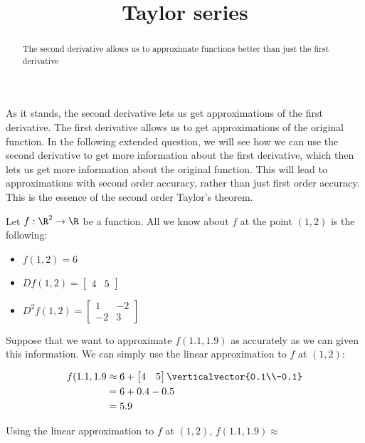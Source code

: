 \documentclass{ximera}
\title{Taylor series}
\begin{document}
	\begin{abstract}
		The second derivative allows us to approximate functions better than just the first derivative
	\end{abstract}
	
	As it stands, the second derivative lets us get approximations of the first derivative.  The first derivative allows us to get approximations of the original function.
	In the following extended question, we will see how we can use the second derivative to get more information about the first derivative, which then lets us get more
	information about the original function.  This will lead to approximations with second order accuracy, rather than just first order accuracy.  This is the essence of 
	the second order Taylor's theorem.
	
	\begin{question}
	Let $f:\R^2 \to \R$ be a function.  All we know about $f$ at the point $(1,2)$ is the following:
		\begin{itemize}
			\item $f(1,2) = 6$
			\item \(Df(1,2) = \begin{bmatrix} 4 & 5 \end{bmatrix}\)
			\item \( D^2f(1,2)  = \begin{bmatrix} 1 & -2 \\ -2 & 3\end{bmatrix}\)
		\end{itemize} 
		
		Suppose that we want to approximate $f(1.1,1.9)$ as accurately as we can given this information.
		We can simply use the linear approximation to $f$ at $(1,2)$:
		
		\begin{solution}
			\begin{hint}
				\begin{align*}
					f(1.1,1.9 &\approx 6+\begin{bmatrix} 4 & 5 \end{bmatrix} \verticalvector{0.1\\-0.1}\\
							&=6+0.4-0.5\\
							&=5.9
				\end{align*}
			\end{hint}
			Using the linear approximation to $f$ at $(1,2)$, $f(1.1,1.9) \approx$ 
		\end{solution}
		

\end{question}
\end{document}
